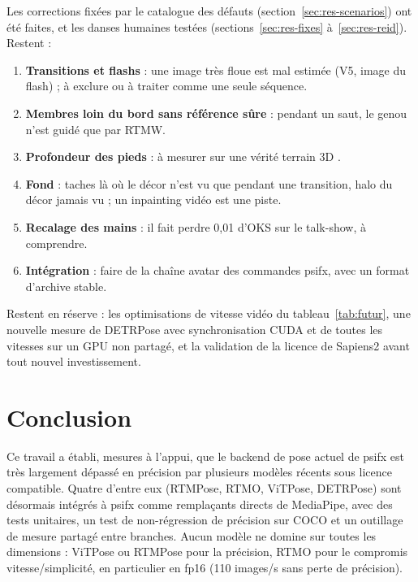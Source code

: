 \documentclass[11pt,a4paper]{report}
\begin{document}
Les corrections fixées par le catalogue des défauts (section~\ref{sec:res-scenarios}) ont été faites, et les danses humaines testées
(sections~\ref{sec:res-fixes} à~\ref{sec:res-reid}). Restent :
\begin{enumerate}[resume]
    \item \textbf{Transitions et flashs} : une image très floue est mal estimée (V5, image du flash) ; à exclure ou à traiter comme
    une seule séquence.
    \item \textbf{Membres loin du bord sans référence sûre} : pendant un saut, le genou n'est guidé que par RTMW.
    \item \textbf{Profondeur des pieds} : à mesurer sur une vérité terrain 3D \cite{wehrbein2026footmr}.
    \item \textbf{Fond} : taches là où le décor n'est vu que pendant une transition, halo du décor jamais vu ; un inpainting vidéo
    \cite{zhou2023propainter} est une piste.
    \item \textbf{Recalage des mains} : il fait perdre 0,01 d'OKS sur le talk-show, à comprendre.
    \item \textbf{Intégration} : faire de la chaîne avatar des commandes psifx, avec un format d'archive stable.
\end{enumerate}

Restent en réserve : les optimisations de vitesse vidéo du tableau~\ref{tab:futur}, une nouvelle mesure de DETRPose
avec synchronisation CUDA et de toutes les vitesses sur un GPU non partagé, et la validation de la licence de
Sapiens2 avant tout nouvel investissement.

\chapter{Conclusion}

Ce travail a établi, mesures à l'appui, que le backend de pose actuel de psifx est très largement dépassé en
précision par plusieurs modèles récents sous licence compatible. Quatre d'entre eux (RTMPose, RTMO, ViTPose,
DETRPose) sont désormais intégrés à psifx comme remplaçants directs de MediaPipe, avec des tests unitaires, un
test de non-régression de précision sur COCO et un outillage de mesure partagé entre branches. Aucun modèle ne
domine sur toutes les dimensions : ViTPose ou RTMPose pour la précision, RTMO pour le compromis
vitesse/simplicité, en particulier en fp16 (110 images/s sans perte de précision).
\end{document}
